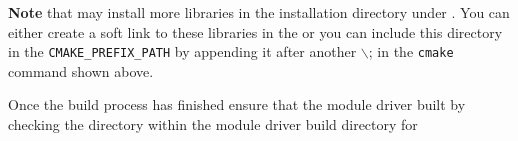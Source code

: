 \textbf{Note} that \elmer may install more libraries in the installation directory under . You can either create a soft link to these libraries in the  or you can include this directory in the \texttt{CMAKE\_PREFIX\_PATH} by appending it after another $\backslash$; in the \texttt{cmake} command shown above.

Once the build process has finished ensure that the module driver built by checking the  directory within the module driver build directory for 
